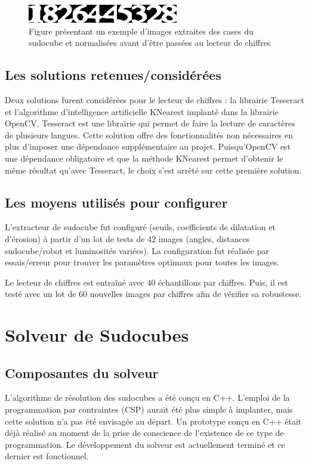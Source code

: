 \begin{figure}[htbp]
\centering
\includegraphics[scale=0.9]{fig/chiffresLues.png}
\caption{Figure présentant un exemple d'images extraites des cases du sudocube et normalisées avant d'être passées au lecteur de chiffres}
\label{fig:chifLu}
\end{figure}

\subsection{Les solutions retenues/considérées}
Deux solutions furent considérées pour le lecteur de chiffres : la librairie Tesseract et l'algorithme d'intelligence artificielle KNearest implanté dans la librairie OpenCV. Tesseract est une librairie qui permet de faire la lecture de caractères de plusieurs langues. Cette solution offre des fonctionnalités non nécessaires en plus d'imposer une dépendance supplémentaire au projet. Puisqu’OpenCV est une dépendance obligatoire et que la méthode KNearest permet d'obtenir le même résultat qu'avec Tesseract, le choix s'est arrêté sur cette première solution.

\subsection{Les moyens utilisés pour configurer}
L'extracteur de sudocube fut configuré (seuils, coefficients de dilatation et d'érosion) à partir d'un lot de tests de 42 images (angles, distances sudocube/robot et luminosités variées). La configuration fut réalisée par essais/erreur pour trouver les paramètres optimaux pour toutes les images.

Le lecteur de chiffres est entraîné avec 40 échantillons par chiffres. Puis, il est testé avec un lot de 60 nouvelles images par chiffres afin de vérifier sa robustesse.

\section{Solveur de Sudocubes}

\subsection{Composantes du solveur}
L'algorithme de résolution des sudocubes a été conçu en C++. L'emploi de la programmation par contraintes (CSP) aurait été plus simple à implanter, mais cette solution n'a pas été envisagée au départ. Un prototype conçu en C++ était déjà réalisé au moment de la prise de conscience de l'existence de ce type de programmation. Le développement du solveur est actuellement terminé et ce dernier est fonctionnel.


